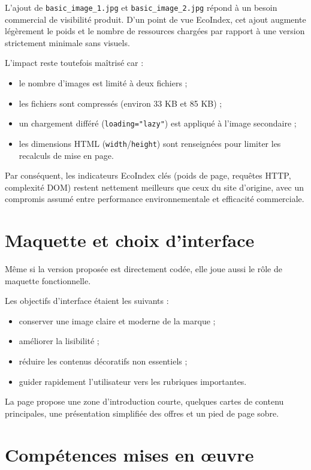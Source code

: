 \documentclass[11pt,a4paper]{article}
\begin{document}
L'ajout de \texttt{basic\_image\_1.jpg} et \texttt{basic\_image\_2.jpg} répond à un besoin commercial de visibilité produit. D'un point de vue EcoIndex, cet ajout augmente légèrement le poids et le nombre de ressources chargées par rapport à une version strictement minimale sans visuels.

L'impact reste toutefois maîtrisé car :
\begin{itemize}
\item le nombre d'images est limité à deux fichiers ;
\item les fichiers sont compressés (environ 33 KB et 85 KB) ;
\item un chargement différé (\texttt{loading="lazy"}) est appliqué à l'image secondaire ;
\item les dimensions HTML (\texttt{width}/\texttt{height}) sont renseignées pour limiter les recalculs de mise en page.
\end{itemize}

Par conséquent, les indicateurs EcoIndex clés (poids de page, requêtes HTTP, complexité DOM) restent nettement meilleurs que ceux du site d'origine, avec un compromis assumé entre performance environnementale et efficacité commerciale.

\section{Maquette et choix d'interface}

Même si la version proposée est directement codée, elle joue aussi le rôle de maquette fonctionnelle.

Les objectifs d'interface étaient les suivants :

\begin{itemize}
\item conserver une image claire et moderne de la marque ;
\item améliorer la lisibilité ;
\item réduire les contenus décoratifs non essentiels ;
\item guider rapidement l'utilisateur vers les rubriques importantes.
\end{itemize}

La page propose une zone d'introduction courte, quelques cartes de contenu principales, une présentation simplifiée des offres et un pied de page sobre.

\section{Compétences mises en œuvre}
\end{document}
